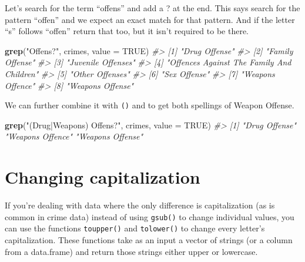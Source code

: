 \documentclass[
  12pt,
]{book}
\newenvironment{Shaded}{\begin{snugshade}}{\end{snugshade}}
\newcommand{\CommentTok}[1]{\textcolor[rgb]{0.56,0.35,0.01}{\textit{#1}}}
\newcommand{\DataTypeTok}[1]{\textcolor[rgb]{0.13,0.29,0.53}{#1}}
\newcommand{\KeywordTok}[1]{\textcolor[rgb]{0.13,0.29,0.53}{\textbf{#1}}}
\newcommand{\NormalTok}[1]{#1}
\newcommand{\OtherTok}[1]{\textcolor[rgb]{0.56,0.35,0.01}{#1}}
\newcommand{\StringTok}[1]{\textcolor[rgb]{0.31,0.60,0.02}{#1}}
\begin{document}
Let's search for the term ``offens'' and add a ? at the end. This says search for the pattern ``offen'' and we expect an exact match for that pattern. And if the letter ``s'' follows ``offen'' return that too, but it isn't required to be there.

\begin{Shaded}
\begin{Highlighting}[]
\KeywordTok{grep}\NormalTok{(}\StringTok{"Offens?"}\NormalTok{, crimes, }\DataTypeTok{value =} \OtherTok{TRUE}\NormalTok{)}
\CommentTok{\#> [1] "Drug Offense"                            }
\CommentTok{\#> [2] "Family Offense"                          }
\CommentTok{\#> [3] "Juvenile Offenses"                       }
\CommentTok{\#> [4] "Offences Against The Family And Children"}
\CommentTok{\#> [5] "Other Offenses"                          }
\CommentTok{\#> [6] "Sex Offense"                             }
\CommentTok{\#> [7] "Weapons Offence"                         }
\CommentTok{\#> [8] "Weapons Offense"}
\end{Highlighting}
\end{Shaded}

We can further combine it with \texttt{()} and \texttt{\textbar{}} to get both spellings of Weapon Offense.

\begin{Shaded}
\begin{Highlighting}[]
\KeywordTok{grep}\NormalTok{(}\StringTok{"(Drug|Weapons) Offens?"}\NormalTok{, crimes, }\DataTypeTok{value =} \OtherTok{TRUE}\NormalTok{)}
\CommentTok{\#> [1] "Drug Offense"    "Weapons Offence" "Weapons Offense"}
\end{Highlighting}
\end{Shaded}

\hypertarget{changing-capitalization}{%
\section{Changing capitalization}\label{changing-capitalization}}

If you're dealing with data where the only difference is capitalization (as is common in crime data) instead of using \texttt{gsub()} to change individual values, you can use the functions \texttt{toupper()} and \texttt{tolower()} to change every letter's capitalization. These functions take as an input a vector of strings (or a column from a data.frame) and return those strings either upper or lowercase.
\end{document}
